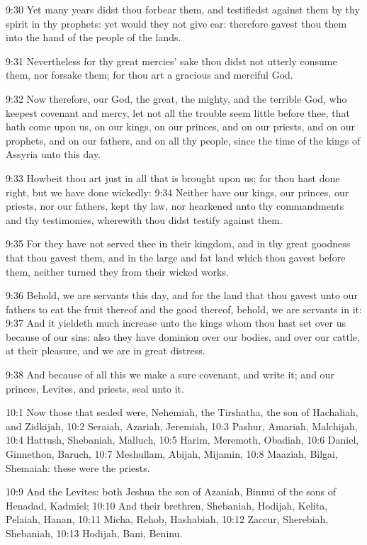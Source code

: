9:30 Yet many years didst thou forbear them, and testifiedst against
them by thy spirit in thy prophets: yet would they not give ear:
therefore gavest thou them into the hand of the people of the lands.

9:31 Nevertheless for thy great mercies' sake thou didst not utterly
consume them, nor forsake them; for thou art a gracious and merciful
God.

9:32 Now therefore, our God, the great, the mighty, and the terrible
God, who keepest covenant and mercy, let not all the trouble seem
little before thee, that hath come upon us, on our kings, on our
princes, and on our priests, and on our prophets, and on our fathers,
and on all thy people, since the time of the kings of Assyria unto
this day.

9:33 Howbeit thou art just in all that is brought upon us; for thou
hast done right, but we have done wickedly: 9:34 Neither have our
kings, our princes, our priests, nor our fathers, kept thy law, nor
hearkened unto thy commandments and thy testimonies, wherewith thou
didst testify against them.

9:35 For they have not served thee in their kingdom, and in thy great
goodness that thou gavest them, and in the large and fat land which
thou gavest before them, neither turned they from their wicked works.

9:36 Behold, we are servants this day, and for the land that thou
gavest unto our fathers to eat the fruit thereof and the good thereof,
behold, we are servants in it: 9:37 And it yieldeth much increase unto
the kings whom thou hast set over us because of our sins: also they
have dominion over our bodies, and over our cattle, at their pleasure,
and we are in great distress.

9:38 And because of all this we make a sure covenant, and write it;
and our princes, Levites, and priests, seal unto it.

10:1 Now those that sealed were, Nehemiah, the Tirshatha, the son of
Hachaliah, and Zidkijah, 10:2 Seraiah, Azariah, Jeremiah, 10:3 Pashur,
Amariah, Malchijah, 10:4 Hattush, Shebaniah, Malluch, 10:5 Harim,
Meremoth, Obadiah, 10:6 Daniel, Ginnethon, Baruch, 10:7 Meshullam,
Abijah, Mijamin, 10:8 Maaziah, Bilgai, Shemaiah: these were the
priests.

10:9 And the Levites: both Jeshua the son of Azaniah, Binnui of the
sons of Henadad, Kadmiel; 10:10 And their brethren, Shebaniah,
Hodijah, Kelita, Pelaiah, Hanan, 10:11 Micha, Rehob, Hashabiah, 10:12
Zaccur, Sherebiah, Shebaniah, 10:13 Hodijah, Bani, Beninu.


